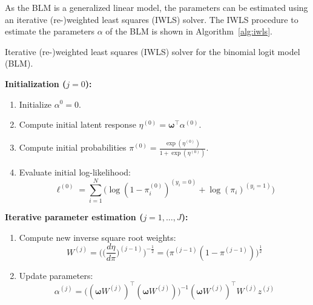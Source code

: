 \documentclass[article,nojss,shortnames]{jss}
\begin{document}
As the BLM is a generalized linear model, the parameters can be estimated using
an iterative (re-)weighted least squares (IWLS) solver.
The IWLS procedure to estimate the parameters $\mathit{\alpha}$ of the BLM
is shown in Algorithm~\ref{alg:iwls}.

\begin{algorithm}
    \caption{Iterative (re-)weighted least squares (IWLS) solver for the binomial logit model (BLM).}
    \label{alg:iwls}

    \textbf{Initialization ($j = 0$):}
    \begin{enumerate}
        \item Initialize $\mathit{\alpha}^{0} = 0$.
        \item Compute initial latent response $\mathit{\eta}^{(0)} = \mathbf{\omega}^\top\mathit{\alpha}^{(0)}$.
        \item Compute initial probabilities $\pi^{(0)} = \frac{\exp(\eta^{(0)})}{1 + \exp(\eta^{(0)})}$. 
        \item Evaluate initial log-likelihood:
            \begin{equation*}
                \ell^{(0)} = %
                \sum_{i=1}^{N} \Big(\log(1 - \pi_i^{(0)})^{(y_i = 0)} + \log(\pi_i)^{(y_i=1)}\Big)
            \end{equation*}

    \end{enumerate}
    \textbf{Iterative parameter estimation ($j = 1, \dots, J$):}
    \begin{enumerate}
        \item Compute new inverse square root weights:
            \begin{equation*}
                \mathit{W}^{(j)} = \Big(\big(\frac{d\eta}{d\pi}\big)^{(j-1)}\Big)^{-\frac{1}{2}} =
                    \big(\mathit{\pi}^{(j-1)} (1 - \mathit{\pi}^{(j-1)})\big)^\frac{1}{2}
            \end{equation*}
        \item Update parameters:
            \begin{equation*}
                \mathit{\alpha}^{(j)} =
                    \big((\mathbf{\omega} \mathit{W}^{(j)})^\top
                    (\mathbf{\omega} \mathit{W}^{(j)})\big)^{-1}
                    (\mathbf{\omega} \mathit{W}^{(j)})^\top
                    \mathit{W}^{(j)} \mathit{z}^{(j)}
            \end{equation*}


\end{enumerate}
\end{algorithm}
\end{document}

